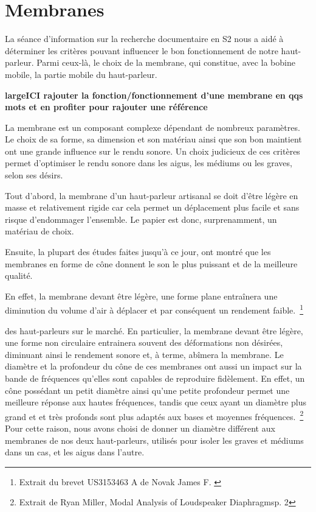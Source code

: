 \section{Membranes}

La séance d’information sur la recherche documentaire en S2
nous a aidé à déterminer les critères pouvant influencer
le bon fonctionnement de notre haut-parleur.
Parmi ceux-là, le choix de la membrane, qui constitue, avec la bobine mobile, la partie mobile
du haut-parleur.


\textbf{large{ICI rajouter la fonction/fonctionnement d'une membrane en qqs mots} et en profiter pour rajouter une référence}


La membrane est un composant complexe dépendant de nombreux paramètres. Le choix de sa forme, sa dimension et son matériau ainsi que son bon maintient ont une grande influence sur le rendu sonore. Un choix judicieux de ces critères permet d'optimiser le rendu sonore dans les aigus, les médiums ou les graves, selon ses désirs.

Tout d’abord, la membrane d’un haut-parleur artisanal
se doit d’être légère en masse et relativement rigide
car cela permet un déplacement plus facile et
sans risque d’endommager l’ensemble.
Le papier est donc, surprenamment, un matériau de choix.

Ensuite, la plupart des études faites jusqu’à ce jour,
ont montré que les membranes en forme de cône
donnent le son le plus puissant et de la meilleure qualité.

En effet, la membrane devant être légère, une forme plane entraînera une diminution du volume d’air à déplacer et par conséquent un rendement faible.~\footnote{Extrait du brevet US3153463 A de Novak James F. \cite{f1964compound}}

des haut-parleurs sur le marché.
En particulier, la membrane devant être légère,
une forme non circulaire entrainera souvent des déformations non désirées,
diminuant ainsi le rendement sonore et, à terme, abîmera la membrane.
%
Le diamètre et la profondeur du cône de ces membranes
ont aussi un impact sur la bande de fréquences
qu’elles sont capables de reproduire fidèlement.
En effet, un cône possédant un petit diamètre ainsi qu'une petite profondeur
permet une meilleure réponse aux hautes fréquences,
tandis que ceux ayant un diamètre plus grand et et très profonds sont plus adaptés aux bases et moyennes fréquences.~\footnote{Extrait de Ryan Miller, \og Modal Analysis of Loudspeaker Diaphragms\fg p. 2}
Pour cette raison, nous avons choisi de donner un diamètre
différent aux membranes de nos deux haut-parleurs,
utilisés pour isoler les graves et médiums dans un cas,
et les aigus dans l'autre.

